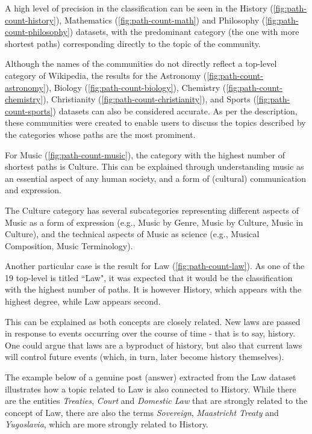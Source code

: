 A high level of precision in the classification can be seen in the History (\ref{fig:path-count-history}), Mathematics (\ref{fig:path-count-math}) and Philosophy (\ref{fig:path-count-philosophy}) datasets, with the predominant category (the one with more shortest paths) corresponding directly to the topic of the community. 

Although the names of the communities do not directly reflect a top-level category of Wikipedia, the results for the Astronomy (\ref{fig:path-count-astronomy}), Biology (\ref{fig:path-count-biology}), Chemistry (\ref{fig:path-count-chemistry}), Christianity (\ref{fig:path-count-christianity}), and Sports (\ref{fig:path-count-sports}) datasets can also be considered accurate. As per the description, these communities were created to enable users to discuss the topics described by the categories whose paths are the most prominent.

For Music (\ref{fig:path-count-music}), the category with the highest number of shortest paths is Culture. This can be explained through understanding music as an essential aspect of any human society, and a form of (cultural) communication and expression.




The Culture category has several subcategories representing different aspects of Music as a form of expression (e.g., Music by Genre, Music by Culture, Music in Culture), and the technical aspects of Music as science (e.g., Musical Composition, Music Terminology).

Another particular case is the result for Law (\ref{fig:path-count-law}). As one of the 19 top-level is titled ``Law", it was expected that it would be the classification with the highest number of paths. It is however History, which appears with the highest degree, while Law appears second.

This can be explained as both concepts are closely related. New laws are passed in response to events occurring over the course of time - that is to say, history. One could argue that laws are a byproduct of history, but also that current laws will control future events (which, in turn, later become history themselves).

The example below of a genuine post (answer) extracted from the Law dataset illustrates how a topic related to Law is also connected to History. While there are the entities \textit{Treaties}, \textit{Court} and \textit{Domestic Law} that are strongly related to the concept of Law, there are also the terms \textit{Sovereign}, \textit{Maastricht Treaty} and \textit{Yugoslavia}, which are more strongly related to History. 

